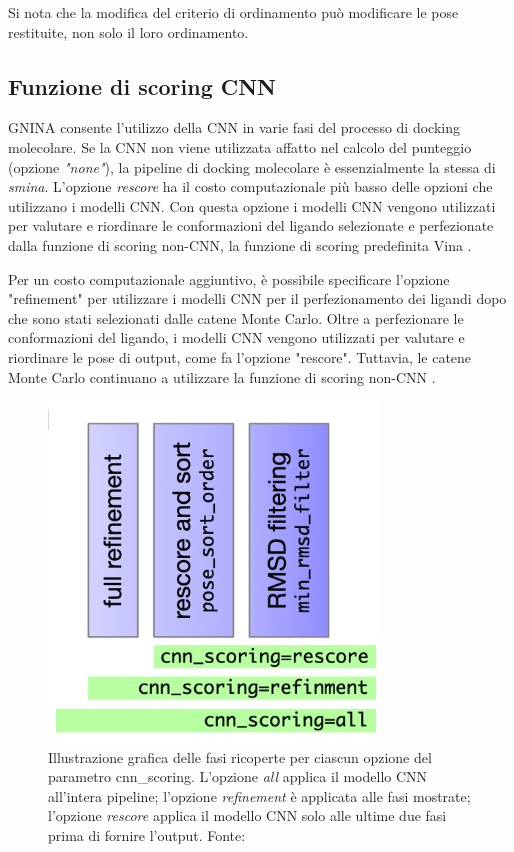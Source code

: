 Si nota che la modifica del criterio di ordinamento può modificare le pose restituite, non solo il loro ordinamento.

\subsection{Funzione di scoring CNN} \label{cnn_scoring_method}
GNINA consente l'utilizzo della CNN in varie fasi del processo di docking molecolare. 
Se la CNN non viene utilizzata affatto nel calcolo del punteggio (opzione \textit{"none"}), la pipeline di docking molecolare è essenzialmente la stessa di \textit{smina}. 
L'opzione \textit{rescore} ha il costo computazionale più basso delle opzioni che utilizzano i modelli CNN.
Con questa opzione i modelli CNN vengono utilizzati per valutare e riordinare le conformazioni del ligando selezionate e perfezionate dalla funzione di scoring non-CNN, la funzione di scoring predefinita Vina \cite{mcnutt_gnina_2021}. 

Per un costo computazionale aggiuntivo, è possibile specificare l'opzione "refinement" per utilizzare i modelli CNN per il perfezionamento dei ligandi dopo che sono stati selezionati dalle catene Monte Carlo. 
Oltre a perfezionare le conformazioni del ligando, i modelli CNN vengono utilizzati per valutare e riordinare le pose di output, come fa l'opzione "rescore". Tuttavia, le catene Monte Carlo continuano a utilizzare la funzione di scoring non-CNN \cite{mcnutt_gnina_2021}. 

\begin{figure}[H]
    \centering
    \includegraphics{images/chapter2/cnn_scoring.jpg}
    \caption[Fasi ricoperte dalle opzioni per il parametro cnn\_scoring.]{Illustrazione grafica delle fasi ricoperte per ciascun opzione del parametro cnn\_scoring. L'opzione \textit{all} applica il modello CNN all'intera pipeline; l'opzione \textit{refinement} è applicata alle fasi mostrate; l'opzione \textit{rescore} applica il modello CNN solo alle ultime due fasi prima di fornire l'output. Fonte: \cite{mcnutt_gnina_2021}}
    \label{fig:cnn_scoring}
\end{figure}

